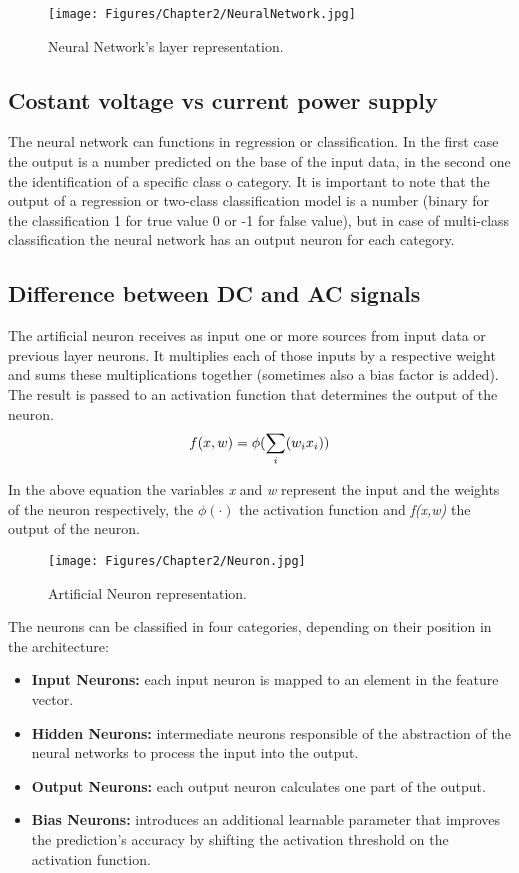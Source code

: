 \begin{figure}[th]
    \centering
    \texttt{[image: Figures/Chapter2/NeuralNetwork.jpg]}
    \caption[Neural Network]{Neural Network's layer representation.}
    \label{fig:NeuralNetwork}
\end{figure}

\subsection{Costant voltage vs current power supply}
The neural network can functions in regression or classification. In the first case the output is a number predicted on the base of the input data, in the second one the identification of a specific class o category. It is important to note that the output of a regression or two-class classification model is a number (binary for the classification 1 for true value 0 or -1 for false value), but in case of multi-class classification the neural network has an output neuron for each category. 

\subsection{Difference between DC and AC signals}
The artificial neuron receives as input one or more sources from input data or previous layer neurons. It multiplies each of those inputs by a respective weight and sums these multiplications together (sometimes also a bias factor is added). The result is passed to an activation function that determines the output of the neuron.\\
\begin{equation}
    f(x,w) = \phi(\sum_i(w_i\*x_i))
\end{equation}

In the above equation the variables \textit{x} and \textit{w} represent the input and the weights of the neuron respectively, the \(\phi(\cdot)\) the activation function and \textit{f(x,w)} the output of the neuron.

\begin{figure}[th]
    \centering
    \texttt{[image: Figures/Chapter2/Neuron.jpg]}
    \caption[Neuron]{Artificial Neuron representation.}
    \label{fig:Neuron}
\end{figure}

The neurons can be classified in four categories, depending on their position in the architecture:
\begin{itemize}
    \item\textbf{Input Neurons:} each input neuron is mapped to an element in the feature vector.
    \item\textbf{Hidden Neurons:} intermediate neurons responsible of the abstraction of the neural networks to process the input into the output.
    \item\textbf{Output Neurons:} each output neuron calculates one part of the output.
    \item\textbf{Bias Neurons:} introduces an additional learnable parameter that improves the prediction's accuracy by shifting the activation threshold on the activation function.
\end{itemize}

